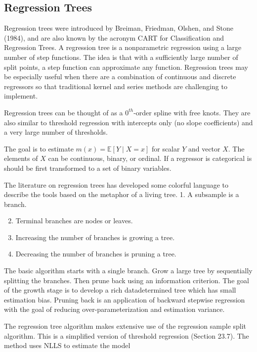 \documentclass[10pt]{article}
\begin{document}
\subsection{Regression Trees}
Regression trees were introduced by Breiman, Friedman, Olshen, and Stone (1984), and are also known by the acronym CART for Classification and Regression Trees. A regression tree is a nonparametric regression using a large number of step functions. The idea is that with a sufficiently large number of split points, a step function can approximate any function. Regression trees may be especially useful when there are a combination of continuous and discrete regressors so that traditional kernel and series methods are challenging to implement.

Regression trees can be thought of as a $0^{t h}$-order spline with free knots. They are also similar to threshold regression with intercepts only (no slope coefficients) and a very large number of thresholds.

The goal is to estimate $m(x)=\mathbb{E}[Y \mid X=x]$ for scalar $Y$ and vector $X$. The elements of $X$ can be continuous, binary, or ordinal. If a regressor is categorical is should be first transformed to a set of binary variables.

The literature on regression trees has developed some colorful language to describe the tools based on the metaphor of a living tree. 1. A subsample is a branch.

\begin{enumerate}
  \setcounter{enumi}{1}
  \item Terminal branches are nodes or leaves.

  \item Increasing the number of branches is growing a tree.

  \item Decreasing the number of branches is pruning a tree.

\end{enumerate}

The basic algorithm starts with a single branch. Grow a large tree by sequentially splitting the branches. Then prune back using an information criterion. The goal of the growth stage is to develop a rich datadetermined tree which has small estimation bias. Pruning back is an application of backward stepwise regression with the goal of reducing over-parameterization and estimation variance.

The regression tree algorithm makes extensive use of the regression sample split algorithm. This is a simplified version of threshold regression (Section 23.7). The method uses NLLS to estimate the model
\end{document}
